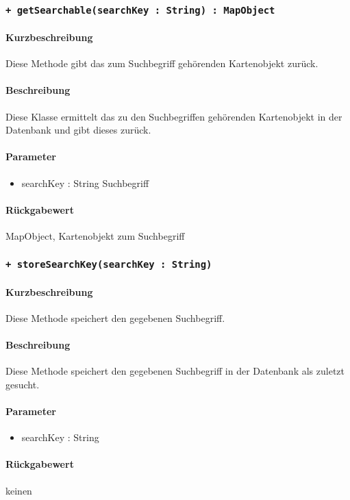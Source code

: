 \subsubsection{\texttt{+ getSearchable(searchKey : String) : MapObject}}%
\paragraph*{Kurzbeschreibung}
Diese Methode gibt das zum Suchbegriff gehörenden Kartenobjekt zurück.
\paragraph*{Beschreibung}
Diese Klasse ermittelt das zu den Suchbegriffen gehörenden Kartenobjekt in der Datenbank und gibt dieses zurück.
\paragraph*{Parameter}
\begin{itemize}
    \item searchKey : String Suchbegriff
\end{itemize}
\paragraph*{Rückgabewert}
MapObject, Kartenobjekt zum Suchbegriff

\subsubsection{\texttt{+ storeSearchKey(searchKey : String)}}%
\paragraph*{Kurzbeschreibung}
Diese Methode speichert den gegebenen Suchbegriff.
\paragraph*{Beschreibung}
Diese Methode speichert den gegebenen Suchbegriff in der Datenbank als zuletzt gesucht.
\paragraph*{Parameter}
\begin{itemize}
    \item searchKey : String
\end{itemize}
\paragraph*{Rückgabewert}
keinen

